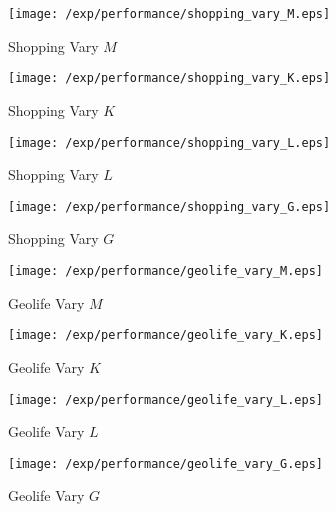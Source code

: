 \begin{figure*}[t]
\centering
    \begin{subfigure}[b]{0.23\textwidth}
        \texttt{[image: /exp/performance/shopping\_vary\_M.eps]}
        \caption{Shopping Vary $M$}
    \end{subfigure}
    \begin{subfigure}[b]{0.23\textwidth}
        \texttt{[image: /exp/performance/shopping\_vary\_K.eps]}
        \caption{Shopping Vary $K$}
    \end{subfigure}
    \begin{subfigure}[b]{0.23\textwidth}
        \texttt{[image: /exp/performance/shopping\_vary\_L.eps]}
        \caption{Shopping Vary $L$}
    \end{subfigure}
       \begin{subfigure}[b]{0.23\textwidth}
        \texttt{[image: /exp/performance/shopping\_vary\_G.eps]}
        \caption{Shopping Vary $G$}
    \end{subfigure}

	\begin{subfigure}[b]{0.23\textwidth}
        \texttt{[image: /exp/performance/geolife\_vary\_M.eps]}
        \caption{Geolife Vary $M$}
    \end{subfigure}
    \begin{subfigure}[b]{0.23\textwidth}
        \texttt{[image: /exp/performance/geolife\_vary\_K.eps]}
        \caption{Geolife Vary $K$}
    \end{subfigure}
    \begin{subfigure}[b]{0.23\textwidth}
        \texttt{[image: /exp/performance/geolife\_vary\_L.eps]}
        \caption{Geolife Vary $L$}
    \end{subfigure}
       \begin{subfigure}[b]{0.23\textwidth}
        \texttt{[image: /exp/performance/geolife\_vary\_G.eps]}
        \caption{Geolife Vary $G$}
    \end{subfigure}
    

\end{figure*}
